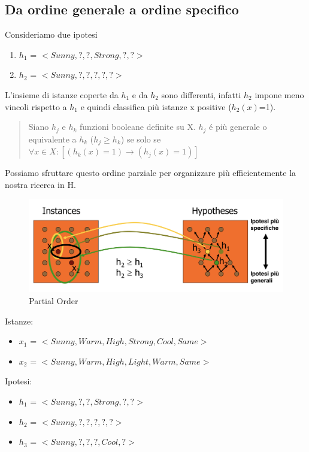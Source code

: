 \documentclass{article}
\begin{document}
\subsection{Da ordine generale a ordine specifico}
Consideriamo due ipotesi
\begin{enumerate}
    \item $h_1$ = $<Sunny,?,?,Strong,?,?>$
    \item $h_2$ = $<Sunny,?,?,?,?,?>$
\end{enumerate}
L'insieme di istanze coperte da $h_1$ e da $h_2$ sono differenti, infatti $h_2$ impone meno vincoli rispetto a $h_1$ e quindi classifica più istanze x positive ($h_2(x)$=1).
\begin{quote}
    Siano $h_j$ e $h_k$ funzioni booleane definite su X. $h_j$ é più generale o equivalente a $h_k$ ($h_j \geq h_k$) se solo se $\forall x \in X : [(h_k(x)=1) \rightarrow (h_j(x)=1)]$
\end{quote}
Possiamo sfruttare questo ordine parziale per organizzare più efficientemente la nostra ricerca in H.
\begin{figure}[H]
    \centering
    \includegraphics[scale=0.4]{Images/partialorder.png}
    \caption{Partial Order}
\end{figure}
Istanze:
\begin{itemize}
    \item $x_1$ = $<Sunny,Warm,High,Strong,Cool,Same>$
    \item $x_2$ = $<Sunny,Warm,High,Light,Warm,Same>$
\end{itemize}
Ipotesi:
\begin{itemize}
    \item $h_1$ = $<Sunny,?,?,Strong,?,?>$
    \item $h_2$ = $<Sunny,?,?,?,?,?>$
    \item $h_3$ = $<Sunny,?,?,?,Cool,?>$
\end{itemize}
\end{document}
